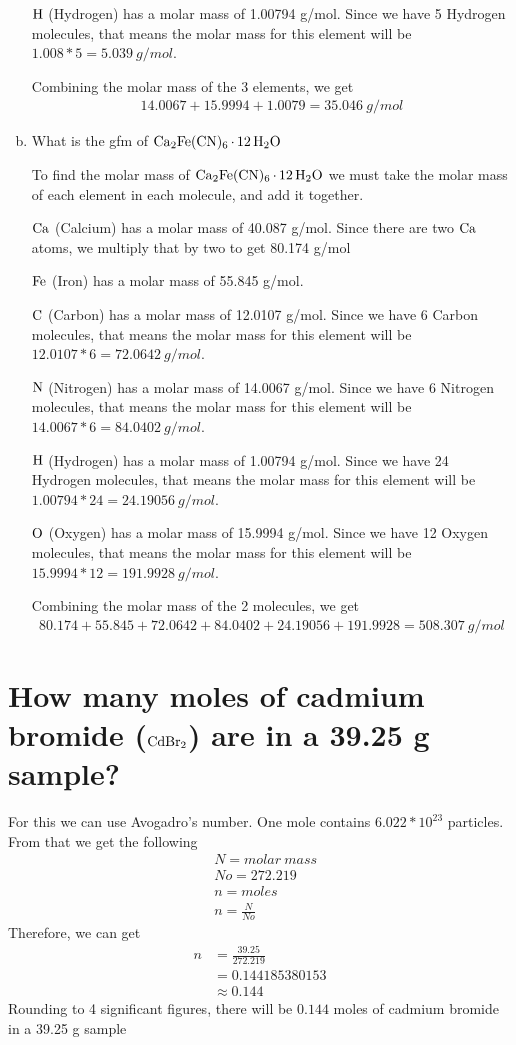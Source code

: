 \documentclass[11pt]{article}
\begin{document}
\begin{enumerate}[(a)]
\(\ce{H}\) (Hydrogen) has a molar mass of 1.00794 g/mol. Since we have 5
Hydrogen molecules, that means the molar mass for this element will be
\(1.008*5=5.039\ g/mol\).

Combining the molar mass of the 3 elements, we get
\begin{align*}
14.0067+15.9994+1.0079=35.046\ g/mol
\end{align*}

\item What is the gfm of \(\ce{Ca2Fe(CN)6*12H2O}\)

 To find the molar mass of \(\ce{Ca2Fe(CN)6*12H2O}\) we must take the molar
mass of each element in each molecule, and add it together.

\(\ce{Ca}\) (Calcium) has a molar mass of 40.087 g/mol. Since there are two
  \(\ce{Ca}\) atoms, we multiply that by two to get 80.174 g/mol

\(\ce{Fe}\) (Iron) has a molar mass of 55.845 g/mol.

\(\ce{C}\) (Carbon) has a molar mass of 12.0107 g/mol. Since we have 6
Carbon molecules, that means the molar mass for this element will be
\(12.0107*6=72.0642\ g/mol\).

\(\ce{N}\) (Nitrogen) has a molar mass of 14.0067 g/mol. Since we have 6
Nitrogen molecules, that means the molar mass for this element will be
\(14.0067*6=84.0402\ g/mol\).

\(\ce{H}\) (Hydrogen) has a molar mass of 1.00794 g/mol. Since we have 24
Hydrogen molecules, that means the molar mass for this element will be
\(1.00794*24=24.19056\ g/mol\).

\(\ce{O}\) (Oxygen) has a molar mass of 15.9994 g/mol. Since we have 12
Oxygen molecules, that means the molar mass for this element will be
\(15.9994*12=191.9928\ g/mol\).

Combining the molar mass of the 2 molecules, we get
\begin{align*}
80.174+55.845+72.0642+84.0402+24.19056+191.9928=508.307\ g/mol
\end{align*}
\end{enumerate}

\section{How many moles of cadmium bromide (\(\ce{CdBr2}\)) are in a 39.25 g sample?}
\label{sec:orgddd6055}
For this we can use Avogadro's number. One mole contains \(6.022*10^{23}\) particles. From that we get the following
\begin{align*}
&N = molar\ mass\\
&No = 272.219\\
&n = moles\\
&n=\frac{N}{No}
\end{align*}
Therefore, we can get
\begin{align*}
n&= \frac{39.25}{272.219}\\
&=0.144185380153\\
&\approx0.144
\end{align*}
Rounding to 4 significant figures, there will be \(0.144\) moles of cadmium bromide in a 39.25 g sample
\end{document}
